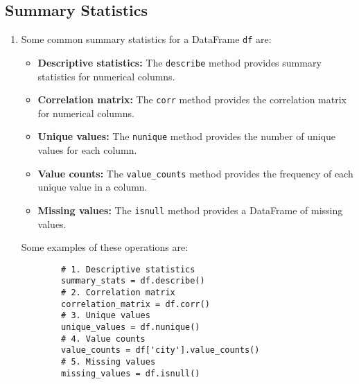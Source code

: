 \documentclass[letterpaper, 11pt]{article}
\newcommand{\1}{\mathds{1}}	%
\theoremstyle{definition}
\begin{document}
\subsection{Summary Statistics}
\begin{enumerate}
    \item Some common summary statistics for a DataFrame \texttt{df} are:
    \begin{itemize}
        \item \textbf{Descriptive statistics:} The \texttt{describe} method provides summary statistics for numerical columns.
        \item \textbf{Correlation matrix:} The \texttt{corr} method provides the correlation matrix for numerical columns.
        \item \textbf{Unique values:} The \texttt{nunique} method provides the number of unique values for each column.
        \item \textbf{Value counts:} The \texttt{value\_counts} method provides the frequency of each unique value in a column.
        \item \textbf{Missing values:} The \texttt{isnull} method provides a DataFrame of missing values.
    \end{itemize}
    Some examples of these operations are:
    \begin{verbatim}
        # 1. Descriptive statistics
        summary_stats = df.describe()
        # 2. Correlation matrix
        correlation_matrix = df.corr()
        # 3. Unique values
        unique_values = df.nunique()
        # 4. Value counts
        value_counts = df['city'].value_counts()
        # 5. Missing values
        missing_values = df.isnull()
    \end{verbatim}
\end{enumerate}
\end{document}
